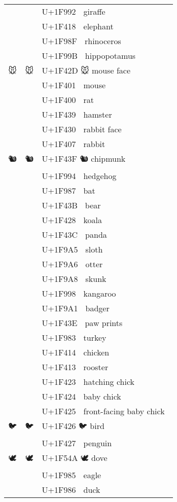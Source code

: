 \documentclass[a4paper,12pt]{ltjarticle}
\newcommand{\fontA}[1]{{\fontspec[RawFeature={mode=harf,+dist,+ccmp}]{Segoe UI Emoji} #1}}
\newcommand{\fontB}[1]{{\fontspec[RawFeature={mode=harf,+dist,+ccmp}]{Noto Color Emoji} #1}}
\begin{document}
\begin{longtable}[c]{ccp{0.8\linewidth}}
\fontA{🦒}&\fontB{🦒}&U+1F992 🦒 giraffe\\
\fontA{🐘}&\fontB{🐘}&U+1F418 🐘 elephant\\
\fontA{🦏}&\fontB{🦏}&U+1F98F 🦏 rhinoceros\\
\fontA{🦛}&\fontB{🦛}&U+1F99B 🦛 hippopotamus\\
\fontA{🐭}&\fontB{🐭}&U+1F42D 🐭 mouse face\\
\fontA{🐁}&\fontB{🐁}&U+1F401 🐁 mouse\\
\fontA{🐀}&\fontB{🐀}&U+1F400 🐀 rat\\
\fontA{🐹}&\fontB{🐹}&U+1F439 🐹 hamster\\
\fontA{🐰}&\fontB{🐰}&U+1F430 🐰 rabbit face\\
\fontA{🐇}&\fontB{🐇}&U+1F407 🐇 rabbit\\
\fontA{🐿}&\fontB{🐿}&U+1F43F 🐿 chipmunk\\
\fontA{🦔}&\fontB{🦔}&U+1F994 🦔 hedgehog\\
\fontA{🦇}&\fontB{🦇}&U+1F987 🦇 bat\\
\fontA{🐻}&\fontB{🐻}&U+1F43B 🐻 bear\\
\fontA{🐨}&\fontB{🐨}&U+1F428 🐨 koala\\
\fontA{🐼}&\fontB{🐼}&U+1F43C 🐼 panda\\
\fontA{🦥}&\fontB{🦥}&U+1F9A5 🦥 sloth\\
\fontA{🦦}&\fontB{🦦}&U+1F9A6 🦦 otter\\
\fontA{🦨}&\fontB{🦨}&U+1F9A8 🦨 skunk\\
\fontA{🦘}&\fontB{🦘}&U+1F998 🦘 kangaroo\\
\fontA{🦡}&\fontB{🦡}&U+1F9A1 🦡 badger\\
\fontA{🐾}&\fontB{🐾}&U+1F43E 🐾 paw prints\\
\fontA{🦃}&\fontB{🦃}&U+1F983 🦃 turkey\\
\fontA{🐔}&\fontB{🐔}&U+1F414 🐔 chicken\\
\fontA{🐓}&\fontB{🐓}&U+1F413 🐓 rooster\\
\fontA{🐣}&\fontB{🐣}&U+1F423 🐣 hatching chick\\
\fontA{🐤}&\fontB{🐤}&U+1F424 🐤 baby chick\\
\fontA{🐥}&\fontB{🐥}&U+1F425 🐥 front-facing baby chick\\
\fontA{🐦}&\fontB{🐦}&U+1F426 🐦 bird\\
\fontA{🐧}&\fontB{🐧}&U+1F427 🐧 penguin\\
\fontA{🕊}&\fontB{🕊}&U+1F54A 🕊 dove\\
\fontA{🦅}&\fontB{🦅}&U+1F985 🦅 eagle\\
\fontA{🦆}&\fontB{🦆}&U+1F986 🦆 duck\\

\end{longtable}
\end{document}
